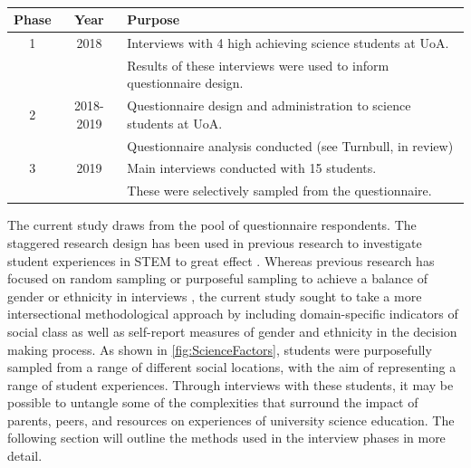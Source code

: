 \begin{table}[ht]
\begin{tabular}{c|c|l}
                      
Phase  & Year & Purpose    \\ \hline
1   & 2018  & Interviews with 4 high achieving science students at UoA.     \\
& & Results of these interviews were used to inform questionnaire design. \\ \hline
2  & 2018-2019 & Questionnaire design and administration to science students at UoA.  \\
& & Questionnaire analysis conducted (see Turnbull, in review)\\ \hline
3 & 2019 & Main interviews conducted with 15 students. \\
& & These were selectively sampled from the questionnaire. \\ \hline
\end{tabular}
\caption{\label{tab:Phases} }
\end{table}

The current study draws from the pool of questionnaire respondents. The staggered research design has been used in previous research to investigate student experiences in STEM to great effect \citep{grossman2014perceived,russell2011factors}. Whereas previous research has focused on random sampling \cite{russell2011factors} or purposeful sampling to achieve a balance of gender or ethnicity in  interviews \citep{grossman2014perceived}, the current study sought to take a more intersectional methodological approach by including domain-specific indicators of social class as well as self-report measures of gender and ethnicity in the decision making process. As shown in \ref{fig:ScienceFactors}, students were purposefully sampled from a range of different social locations, with the aim of representing a range of student experiences. Through interviews with these students, it may be possible to untangle some of the complexities that surround the impact of parents, peers, and resources on experiences of university science education. The following section will outline the methods used in the interview phases in more detail.


